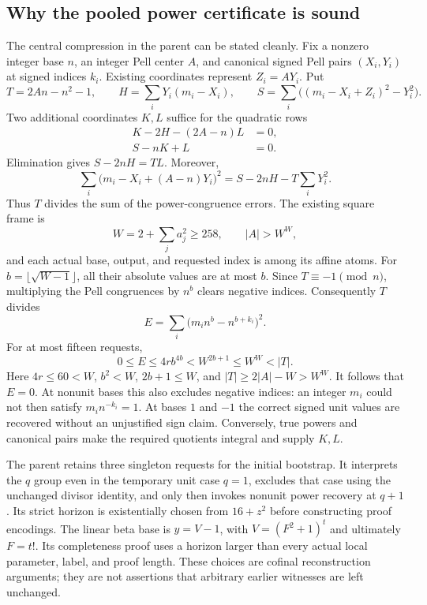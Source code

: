 \documentclass[10pt,letterpaper]{article}
\theoremstyle{definition}\newtheorem{definition}[theorem]{Definition}
\begin{document}
\subsection{Why the pooled power certificate is sound}
The central compression in the parent can be stated cleanly. Fix a nonzero
integer base $n$, an integer Pell center $A$, and canonical signed Pell
pairs $(X_i,Y_i)$ at signed indices $k_i$. Existing coordinates represent
$Z_i=AY_i$. Put
\[
T=2An-n^2-1,\qquad
H=\sum_iY_i(m_i-X_i),\qquad
S=\sum_i\bigl((m_i-X_i+Z_i)^2-Y_i^2\bigr).
\]
Two additional coordinates $K,L$ suffice for the quadratic rows
\begin{align}
K-2H-(2A-n)L&=0,\label{eq:pool1}\\
S-nK+L&=0.\label{eq:pool2}
\end{align}
Elimination gives $S-2nH=TL$. Moreover,
\begin{equation}\label{eq:poolid}
\sum_i\bigl(m_i-X_i+(A-n)Y_i\bigr)^2
   =S-2nH-T\sum_iY_i^2.
\end{equation}
Thus $T$ divides the sum of the power-congruence errors. The existing square
frame is
\[
W=2+\sum_j a_j^2\ge258,\qquad |A|>W^W,
\]
and each actual base, output, and requested index is among its affine
atoms. For $b=\lfloor\sqrt{W-1}\rfloor$, all their absolute values are
at most $b$. Since $T\equiv-1\pmod n$, multiplying the Pell congruences
by $n^b$ clears negative indices. Consequently $T$ divides
\[
E=\sum_i\bigl(m_i n^b-n^{b+k_i}\bigr)^2.
\]
For at most fifteen requests,
\[
0\le E\le4r b^{4b}<W^{2b+1}\le W^W<|T|.
\]
Here $4r\le60<W$, $b^2<W$, $2b+1\le W$, and
$|T|\ge2|A|-W>W^W$. It follows that $E=0$. At nonunit bases this also
excludes negative indices: an integer $m_i$ could not then satisfy
$m_i n^{-k_i}=1$. At bases $1$ and $-1$ the correct signed unit values are
recovered without an unjustified sign claim. Conversely, true powers and
canonical pairs make the required quotients integral and supply $K,L$.

The parent retains three singleton requests for the initial bootstrap.
It interprets the $q$ group even in the temporary unit case $q=1$, excludes
that case using the unchanged divisor identity, and only then invokes
nonunit power recovery at $q+1$. Its strict horizon is existentially chosen
from $16+z^2$ before constructing proof encodings. The linear beta base is
$y=V-1$, with $V=(F^2+1)^t$ and ultimately $F=t!$. Its completeness proof
uses a horizon larger than every actual local parameter, label, and proof
length. These choices are cofinal reconstruction arguments; they are not
assertions that arbitrary earlier witnesses are left unchanged.
\end{document}
